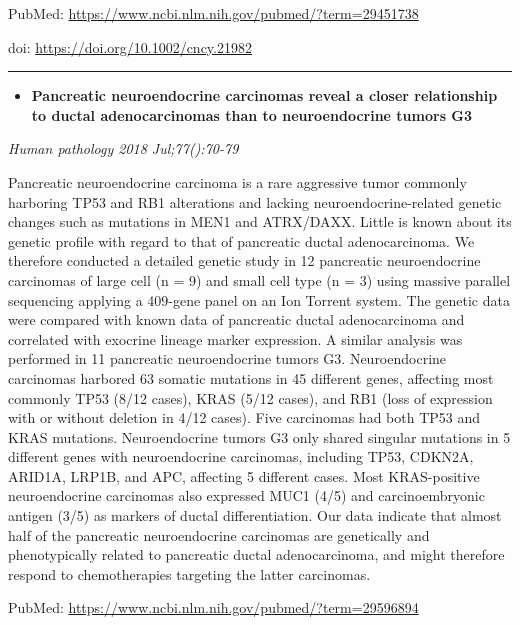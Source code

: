 \documentclass[]{article}
\providecommand{\tightlist}{%
  \setlength{\itemsep}{0pt}\setlength{\parskip}{0pt}}
\begin{document}
PubMed: \url{https://www.ncbi.nlm.nih.gov/pubmed/?term=29451738}

doi: \url{https://doi.org/10.1002/cncy.21982}

{}

{}

\begin{center}\rule{0.5\linewidth}{\linethickness}\end{center}

\begin{itemize}
\tightlist
\item
  \textbf{Pancreatic neuroendocrine carcinomas reveal a closer
  relationship to ductal adenocarcinomas than to neuroendocrine tumors
  G3}
\end{itemize}

\emph{Human pathology 2018 Jul;77():70-79}

Pancreatic neuroendocrine carcinoma is a rare aggressive tumor commonly
harboring TP53 and RB1 alterations and lacking neuroendocrine-related
genetic changes such as mutations in MEN1 and ATRX/DAXX. Little is known
about its genetic profile with regard to that of pancreatic ductal
adenocarcinoma. We therefore conducted a detailed genetic study in 12
pancreatic neuroendocrine carcinomas of large cell (n = 9) and small
cell type (n = 3) using massive parallel sequencing applying a 409-gene
panel on an Ion Torrent system. The genetic data were compared with
known data of pancreatic ductal adenocarcinoma and correlated with
exocrine lineage marker expression. A similar analysis was performed in
11 pancreatic neuroendocrine tumors G3. Neuroendocrine carcinomas
harbored 63 somatic mutations in 45 different genes, affecting most
commonly TP53 (8/12 cases), KRAS (5/12 cases), and RB1 (loss of
expression with or without deletion in 4/12 cases). Five carcinomas had
both TP53 and KRAS mutations. Neuroendocrine tumors G3 only shared
singular mutations in 5 different genes with neuroendocrine carcinomas,
including TP53, CDKN2A, ARID1A, LRP1B, and APC, affecting 5 different
cases. Most KRAS-positive neuroendocrine carcinomas also expressed MUC1
(4/5) and carcinoembryonic antigen (3/5) as markers of ductal
differentiation. Our data indicate that almost half of the pancreatic
neuroendocrine carcinomas are genetically and phenotypically related to
pancreatic ductal adenocarcinoma, and might therefore respond to
chemotherapies targeting the latter carcinomas.

PubMed: \url{https://www.ncbi.nlm.nih.gov/pubmed/?term=29596894}
\end{document}
